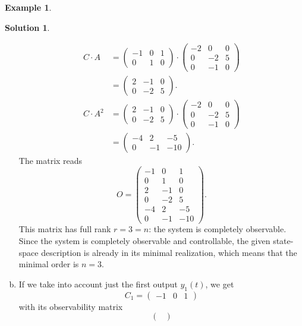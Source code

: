 \documentclass[a4paper,12 pt]{article}
\numberwithin{equation}{section}
\theoremstyle{definition}
\newtheorem{bsp}{Example}
\theoremstyle{remark}
\theoremstyle{definition}
\newtheorem*{lsg}{Solution}
\theoremstyle{definition}
\theoremstyle{definition}
\theoremstyle{remark}
\begin{document}
\begin{bsp}
\begin{lsg}
\begin{enumerate}[(a)]
\begin{equation*}
\begin{split}
C\cdot A&=\begin{pmatrix}
-1&0&1\\ 
0&1&0 
\end{pmatrix}\cdot \begin{pmatrix}
-2&0&0\\
0&-2&5\\
0&-1&0
\end{pmatrix}\\
&=\begin{pmatrix}
2&-1&0\\
0&-2&5
\end{pmatrix}.\\
C\cdot A^2&=\begin{pmatrix}
2&-1&0\\
0&-2&5
\end{pmatrix}\cdot \begin{pmatrix}
-2&0&0\\
0&-2&5\\
0&-1&0
\end{pmatrix}\\
&=\begin{pmatrix}
-4&2&-5\\
0&-1&-10
\end{pmatrix}.
\end{split}
\end{equation*}
The matrix reads
\begin{equation*}
O=\begin{pmatrix}
-1&0&1\\
0&1&0\\
2&-1&0\\
0&-2&5\\
-4&2&-5\\
0&-1&-10
\end{pmatrix}.
\end{equation*}
This matrix has full rank $r=3=n$: the system is completely observable.\\
Since the system is completely observable and controllable, the given state-space description is already in its minimal realization, which means that the minimal order is $n=3$.
\item If we take into account just the first output $y_1(t)$, we get
\begin{equation*}
C_1=\begin{pmatrix} -1&0&1\end{pmatrix}
\end{equation*}
with its observability matrix
\begin{equation*}
\begin{pmatrix}

\end{pmatrix}
\end{equation*}
\end{enumerate}
\end{lsg}
\end{bsp}
\end{document}
